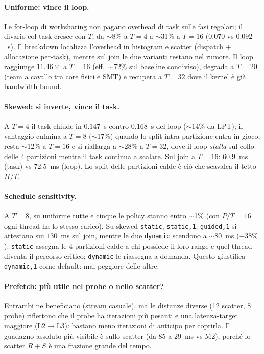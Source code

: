 \documentclass[11pt,a4paper]{article}
\theoremstyle{remark}
\begin{document}
\paragraph{Uniforme: vince il loop.} Le for-loop di worksharing non pagano overhead di task sulle fasi regolari; il divario col task cresce con $T$, da $\sim$8\% a $T=4$ a $\sim$31\% a $T=16$ ($0.070$ vs $0.092$~s). Il breakdown localizza l'overhead in histogram e scatter (dispatch + allocazione per-task), mentre sul join le due varianti restano nel rumore. Il loop raggiunge $11.46\times$ a $T=16$ (eff.\ $\sim$72\% sul baseline condiviso), degrada a $T=20$ (team a cavallo tra core fisici e SMT) e recupera a $T=32$ dove il kernel \`e gi\`a bandwidth-bound.

\paragraph{Skewed: si inverte, vince il task.} A $T=4$ il task chiude in $0.147$~s contro $0.168$~s del loop ($\sim$14\% da LPT); il vantaggio culmina a $T=8$ ($\sim$17\%) quando lo split intra-partizione entra in gioco, resta $\sim$12\% a $T=16$ e si riallarga a $\sim$28\% a $T=32$, dove il loop \emph{stalla} sul collo delle 4 partizioni mentre il task continua a scalare. Sul join a $T=16$: $60.9$~ms (task) vs $72.5$~ms (loop). Lo split delle partizioni calde \`e ci\`o che scavalca il tetto $H/T$.

\paragraph{Schedule sensitivity.} A $T=8$, su uniforme tutte e cinque le policy stanno entro $\sim$1\% (con $P/T=16$ ogni thread ha lo stesso carico). Su skewed \texttt{static}, \texttt{static,1}, \texttt{guided,1} si attestano sui $130$~ms sul join, mentre le due \texttt{dynamic} scendono a $\sim$80~ms ($-38\%$): \texttt{static} assegna le 4 partizioni calde a chi possiede il loro range e quel thread diventa il percorso critico; \texttt{dynamic} le riassegna a domanda. Questo giustifica \texttt{dynamic,1} come default: mai peggiore delle altre.

\paragraph{Prefetch: pi\`u utile nel probe o nello scatter?} Entrambi ne beneficiano (stream casuale), ma le distanze diverse (12 scatter, 8 probe) riflettono che il probe ha iterazioni pi\`u pesanti e una latenza-target maggiore (L2$\to$L3): bastano meno iterazioni di anticipo per coprirla. Il guadagno assoluto pi\`u visibile \`e sullo scatter (da 85 a 29~ms vs M2), perch\'e lo scatter $R{+}S$ \`e una frazione grande del tempo.
\end{document}
